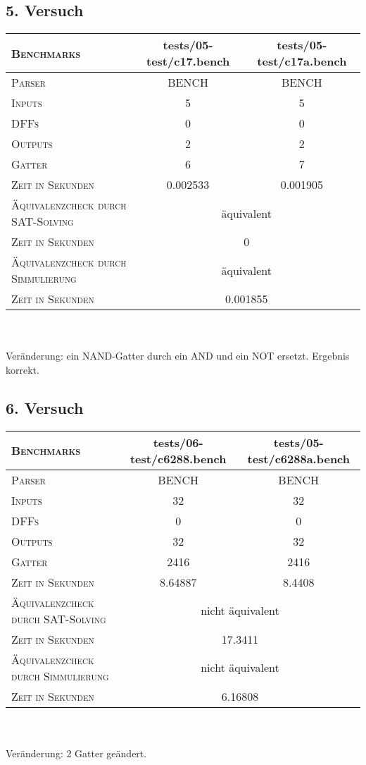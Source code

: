 \subsection{5. Versuch}

\begin{tabular}{|l|c|c|}
	\hline
	\textsc{Benchmarks} & tests/05-test/c17.bench & tests/05-test/c17a.bench \\
	\hline
	\hline
	\textsc{Parser} & BENCH & BENCH \\
	\hline
	\textsc{Inputs} & 5 & 5 \\
	\hline
	\textsc{DFFs} & 0 & 0 \\
	\hline
	\textsc{Outputs} & 2 & 2 \\
	\hline
	\textsc{Gatter} & 6 & 7 \\		
	\hline
	\textsc{Zeit in Sekunden} & 0.002533 & 0.001905 \\ 
	\hline
	\hline
	\textsc{Äquivalenzcheck durch SAT-Solving} & \multicolumn{2}{|c|}{äquivalent} \\
	\hline
	\textsc{Zeit in Sekunden} & \multicolumn{2}{|c|}{0} \\
	\hline
	\hline
	\textsc{Äquivalenzcheck durch Simmulierung} & \multicolumn{2}{|c|}{äquivalent} \\
	\hline
	\textsc{Zeit in Sekunden} & \multicolumn{2}{|c|}{ 0.001855} \\
	\hline
\end{tabular} \\\\
Veränderung: ein NAND-Gatter durch ein AND und ein NOT ersetzt. Ergebnis korrekt.


\subsection{6. Versuch}

\begin{tabular}{|l|c|c|}
	\hline
	\textsc{Benchmarks} & tests/06-test/c6288.bench & tests/05-test/c6288a.bench \\
	\hline
	\hline
	\textsc{Parser} & BENCH & BENCH \\
	\hline
	\textsc{Inputs} & 32 & 32 \\
	\hline
	\textsc{DFFs} & 0 & 0 \\
	\hline
	\textsc{Outputs} & 32 & 32 \\
	\hline
	\textsc{Gatter} & 2416 & 2416 \\		
	\hline
	\textsc{Zeit in Sekunden} & 8.64887 & 8.4408 \\ 
	\hline
	\hline
	\textsc{Äquivalenzcheck durch SAT-Solving} & \multicolumn{2}{|c|}{nicht äquivalent} \\
	\hline
	\textsc{Zeit in Sekunden} & \multicolumn{2}{|c|}{17.3411} \\
	\hline
	\hline
	\textsc{Äquivalenzcheck durch Simmulierung} & \multicolumn{2}{|c|}{nicht äquivalent} \\
	\hline
	\textsc{Zeit in Sekunden} & \multicolumn{2}{|c|}{6.16808} \\
	\hline
\end{tabular} \\\\
Veränderung: 2 Gatter geändert. 
